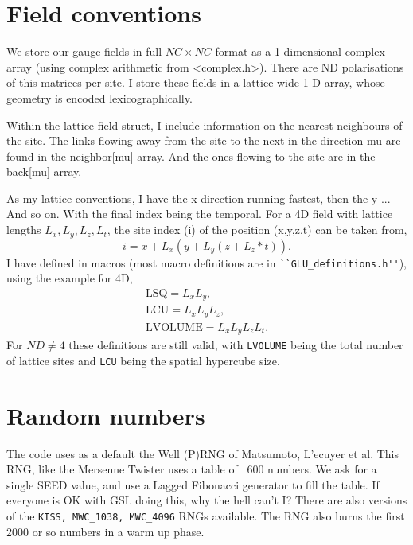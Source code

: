 \documentclass[12pt]{article}
\begin{document}
\section{Field conventions}

We store our gauge fields in full $NC\times NC$ format as a 1-dimensional complex array (using complex arithmetic from <complex.h>).  There are ND polarisations of this matrices per site. I store these fields in a lattice-wide 1-D array, whose geometry is encoded lexicographically.

Within the lattice field struct, I include information on the nearest neighbours of the site. The links flowing away from the site to the next in the direction mu are found in the neighbor[mu] array. And the ones flowing to the site are in the back[mu] array.

As my lattice conventions, I have the x direction running fastest, then the y ... And so on. With the final index being the temporal. For a 4D field with lattice lengths $L_x,L_y,L_z,L_t$, the site index (i) of the position (x,y,z,t) can be taken from,
\begin{equation}
 i = x + L_x( y + L_y( z + L_z * t ) ).
\end{equation}
I have defined in macros (most macro definitions are in \verb|``GLU_definitions.h''|), using the example for 4D,
\begin{equation}
 \begin{gathered}
  \text{LSQ} = L_x L_y,\\
  \text{LCU} = L_x L_y L_z,\\
  \text{LVOLUME} = L_x L_y L_z L_t.
 \end{gathered}
\end{equation}
For $ND\neq 4$ these definitions are still valid, with \verb|LVOLUME| being the total number of lattice sites and \verb|LCU| being the spatial hypercube size.

\section{Random numbers}

The code uses as a default the Well (P)RNG of Matsumoto, L'ecuyer et al. This RNG, like the Mersenne Twister uses a table of ~600 numbers. We ask for a single SEED value, and use a Lagged Fibonacci generator to fill the table. If everyone is OK with GSL doing this, why the hell can't I? There are also versions of the \verb|KISS, MWC_1038, MWC_4096| RNGs available. The RNG also burns the first 2000 or so numbers in a warm up phase.
\end{document}
